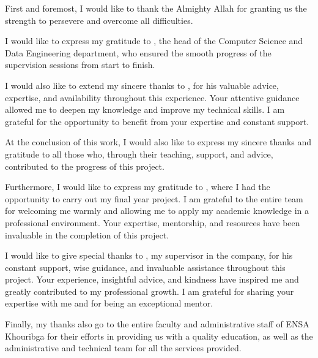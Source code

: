 \remerciements

First and foremost, I would like to thank the Almighty Allah for granting us the strength to persevere and overcome all difficulties.

\medskip

I would like to express my gratitude to \textbf{}, the head of the Computer Science and Data Engineering department, who ensured the smooth progress of the supervision sessions from start to finish.

\medskip

I would also like to extend my sincere thanks to \textbf{}, for his valuable advice, expertise, and availability throughout this experience. Your attentive guidance allowed me to deepen my knowledge and improve my technical skills. I am grateful for the opportunity to benefit from your expertise and constant support.

\medskip

At the conclusion of this work, I would also like to express my sincere thanks and gratitude to all those who, through their teaching, support, and advice, contributed to the progress of this project.

\medskip

Furthermore, I would like to express my gratitude to \textbf{}, where I had the opportunity to carry out my final year project. I am grateful to the entire \textbf{} team for welcoming me warmly and allowing me to apply my academic knowledge in a professional environment. Your expertise, mentorship, and resources have been invaluable in the completion of this project.

\medskip

I would like to give special thanks to \textbf{}, my supervisor in the company, for his constant support, wise guidance, and invaluable assistance throughout this project. Your experience, insightful advice, and kindness have inspired me and greatly contributed to my professional growth. I am grateful for sharing your expertise with me and for being an exceptional mentor.

\medskip

Finally, my thanks also go to the entire faculty and administrative staff of ENSA Khouribga for their efforts in providing us with a quality education, as well as the administrative and technical team for all the services provided.
